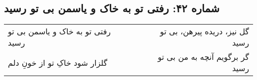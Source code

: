 \begin{center}
\section*{شماره ۴۲: رفتی تو به خاک و یاسمن بی تو رسید}
\label{sec:042}
\begin{longtable}{l p{0.5cm} r}
رفتی تو به خاک و یاسمن بی تو رسید
&&
گل نیز، دریده پیرهن، بی تو رسید
\\
گلزار شود خاکِ تو از خونِ دلم
&&
گر برگویم آنچه به من بی تو رسید
\\
\end{longtable}
\end{center}
